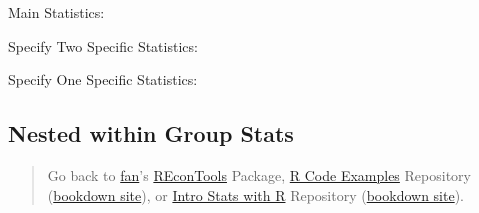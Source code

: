 \documentclass[
]{book}
\newenvironment{Shaded}{\begin{snugshade}}{\end{snugshade}}
\newcommand{\DataTypeTok}[1]{\textcolor[rgb]{0.13,0.29,0.53}{#1}}
\newcommand{\KeywordTok}[1]{\textcolor[rgb]{0.13,0.29,0.53}{\textbf{#1}}}
\newcommand{\NormalTok}[1]{#1}
\newcommand{\OperatorTok}[1]{\textcolor[rgb]{0.81,0.36,0.00}{\textbf{#1}}}
\newcommand{\StringTok}[1]{\textcolor[rgb]{0.31,0.60,0.02}{#1}}
\begin{document}
Main Statistics:

\begin{Shaded}
\end{Shaded}

Specify Two Specific Statistics:

\begin{Shaded}
\end{Shaded}

Specify One Specific Statistics:

\begin{Shaded}
\end{Shaded}

\hypertarget{nested-within-group-stats}{%
\subsection{Nested within Group Stats}\label{nested-within-group-stats}}

\begin{quote}
Go back to \href{http://fanwangecon.github.io/}{fan}'s \href{https://fanwangecon.github.io/REconTools/}{REconTools} Package, \href{https://fanwangecon.github.io/R4Econ/}{R Code Examples} Repository (\href{https://fanwangecon.github.io/R4Econ/bookdown}{bookdown site}), or \href{https://fanwangecon.github.io/Stat4Econ/}{Intro Stats with R} Repository (\href{https://fanwangecon.github.io/Stat4Econ/bookdown}{bookdown site}).
\end{quote}
\end{document}

